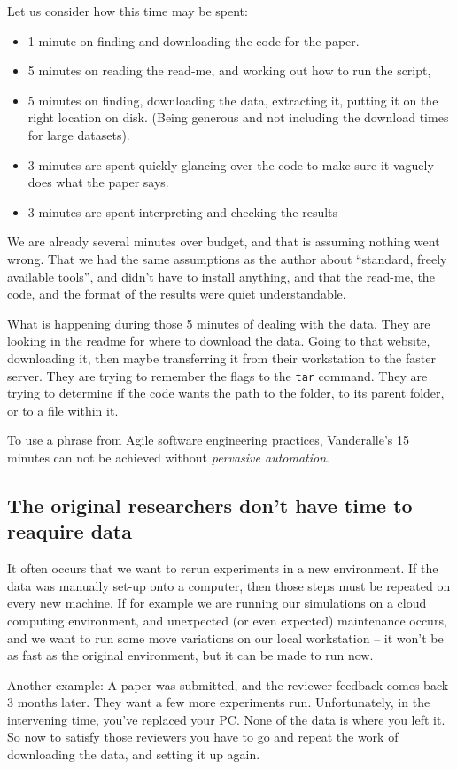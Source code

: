 \documentclass[]{article}
\begin{document}
Let us consider how this time may be spent:
\begin{itemize}
	\item 1 minute on finding and downloading the code for the paper.
	\item 5 minutes on reading the read-me, and working out how to run the script,
	\item 5 minutes on finding, downloading the data, extracting it, putting it on the right location on disk. (Being generous and not including the download times for large datasets).
	\item 3 minutes are spent quickly glancing over the code to make sure it vaguely does what the paper says.
	\item 3 minutes are spent interpreting and checking the results
\end{itemize}
We are already several minutes over budget, and that is assuming nothing went wrong.
That we had the same assumptions as the author about ``standard, freely available tools'', and didn't have to install anything,
and that the read-me, the code, and the format of the results were quiet understandable.

What is happening during those 5 minutes of dealing with the data.
They are looking in the readme for where to download the data.
Going to that website, downloading it, then maybe transferring it from their workstation to the faster server.
They are trying to remember the flags to the \texttt{tar} command.
They are trying to determine if the code wants the path to the folder, to its parent folder, or to a file within it.


To use a phrase from Agile software engineering practices, Vanderalle's 15 minutes can not be achieved without \emph{pervasive automation}.

\subsection{The original researchers don't have time to reaquire data}
It often occurs that we want to rerun experiments in a new environment.
If the data was manually set-up onto a computer, then those steps must be repeated on every new machine.
If for example we are running our simulations on a cloud computing environment,
and unexpected (or even expected) maintenance occurs, and we want to run some move variations on our local workstation -- it won't be as fast as the original environment, but it can be made to run now.

Another example:
A paper was submitted, and the reviewer feedback comes back 3 months later.
They want a few more experiments run.
Unfortunately, in the intervening time, you've replaced your PC.
None of the data is where you left it.
So now to satisfy those reviewers you have to go and repeat the work of downloading the data,
and setting it up again.
\end{document}
